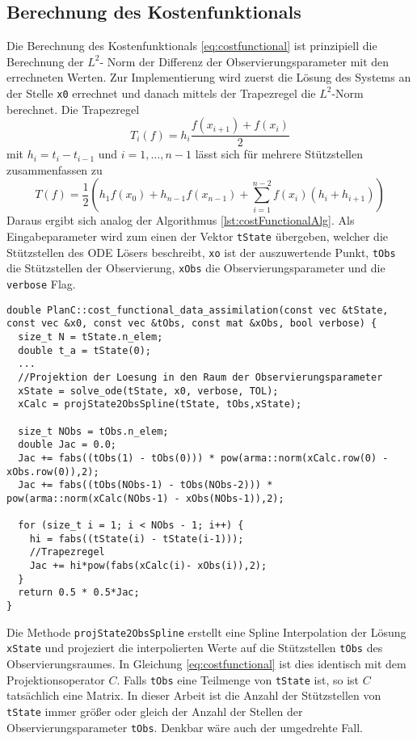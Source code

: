 \subsection{Berechnung des Kostenfunktionals}\label{sec:implementation:costfunctional}
Die Berechnung des Kostenfunktionals \eqref{eq:costfunctional} ist prinzipiell die Berechnung der $L^2$- Norm der Differenz der Observierungsparameter mit den errechneten Werten. Zur Implementierung wird zuerst die Lösung des Systems an der Stelle \texttt{x0} errechnet und danach mittels der Trapezregel die $L^2$-Norm berechnet. Die Trapezregel 
\[
 T_i(f) = h_i \frac{f(x_{i+1})+f(x_i)}{2}
\]
mit $h_i = t_{i}-t_{i-1}$ und $i=1,\ldots,n-1$ lässt sich für mehrere Stützstellen zusammenfassen zu
\[
 T(f) =\frac{1}{2} \left(h_1 f(x_0) + h_{n-1} f(x_{n-1}) + \sum_{i=1}^{n-2} f(x_i)(h_i+h_{i+1})\right)
\]
Daraus ergibt sich analog der Algorithmus \ref{lst:costFunctionalAlg}. Als Eingabeparameter wird zum einen der Vektor \texttt{tState} übergeben, welcher die Stützstellen des ODE Lösers beschreibt, \texttt{xo} ist der auszuwertende Punkt, \texttt{tObs} die Stützstellen der Observierung, \texttt{xObs} die Observierungsparameter und die \texttt{verbose} Flag.
\begin{lstlisting}[caption=Berechnung des Kostenfunktionals,label=lst:costFunctionalAlg]
double PlanC::cost_functional_data_assimilation(const vec &tState, const vec &x0, const vec &tObs, const mat &xObs, bool verbose) {
  size_t N = tState.n_elem;
  double t_a = tState(0);
  ...
  //Projektion der Loesung in den Raum der Observierungsparameter
  xState = solve_ode(tState, x0, verbose, TOL);
  xCalc = projState2ObsSpline(tState, tObs,xState);
  
  size_t NObs = tObs.n_elem;
  double Jac = 0.0;
  Jac += fabs((tObs(1) - tObs(0))) * pow(arma::norm(xCalc.row(0) - xObs.row(0)),2);
  Jac += fabs((tObs(NObs-1) - tObs(NObs-2))) * pow(arma::norm(xCalc(NObs-1) - xObs(NObs-1)),2);

  for (size_t i = 1; i < NObs - 1; i++) {
    hi = fabs((tState(i) - tState(i-1)));
    //Trapezregel
    Jac += hi*pow(fabs(xCalc(i)- xObs(i)),2);
  }
  return 0.5 * 0.5*Jac;
}
\end{lstlisting}
Die Methode \texttt{projState2ObsSpline} erstellt eine Spline Interpolation der Lösung \texttt{xState} und projeziert die interpolierten Werte auf die Stützstellen \texttt{tObs} des Observierungsraumes. In Gleichung \eqref{eq:costfunctional} ist dies identisch mit dem Projektionsoperator $C$. Falls \texttt{tObs} eine Teilmenge von \texttt{tState} ist, so ist $C$ tatsächlich eine Matrix. In dieser Arbeit ist die Anzahl der Stützstellen von \texttt{tState} immer größer oder gleich der Anzahl der Stellen der Observierungsparameter \texttt{tObs}. Denkbar wäre auch der umgedrehte Fall.

